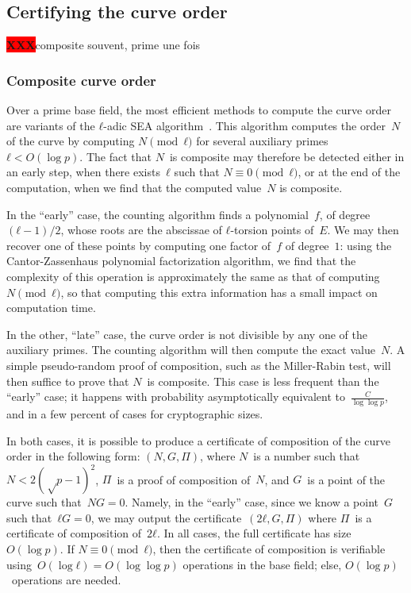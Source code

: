 \documentclass{article}
\def\XXX{{\colorbox{red}{{\color{white}\bfseries XXX}}}}
\begin{document}
\subsection{Certifying the curve order}

\XXX composite souvent, prime une fois

\subsubsection{Composite curve order}

Over a prime base field,
the most efficient methods to compute the curve order are
variants of the $ℓ$-adic SEA algorithm~\cite{mathcomp1985schoof,
jtnb1995schoof}.
This algorithm computes the order~$N$ of the curve
by computing $N \pmod{ℓ}$ for several
auxiliary primes~$ℓ < O(\log p)$.
The fact that $N$~is composite may therefore be detected
either in an early step,
when there exists~$ℓ$ such that $N ≡ 0 \pmod{ℓ}$,
or at the end of the computation,
when we find that the computed value~$N$ is composite.

In the “early” case,
the counting algorithm finds a polynomial~$f$, of degree~$(ℓ-1)/2$,
whose roots are the abscissae of $ℓ$-torsion points of~$E$.
We may then recover one of these points by
computing one factor of~$f$ of degree~$1$:
using the Cantor-Zassenhaus polynomial factorization algorithm,
we find that the complexity of this operation
is approximately the same as that of computing~$N \pmod{ℓ}$,
so that computing this extra information
has a small impact on computation time.

\smallskip

In the other, “late” case, the curve order is not divisible
by any one of the auxiliary primes.
The counting algorithm will then compute the exact value~$N$.
A simple pseudo-random proof of composition,
such as the Miller-Rabin test,
will then suffice to prove that $N$~is composite.
This case is less frequent than the “early” case;
it happens with probability
asymptotically equivalent to~$\frac{C}{\log \log p}$,
and in a few percent of cases for cryptographic sizes.

\smallskip

In both cases, it is possible to produce a certificate of composition
of the curve order in the following form: $(N, G, Π)$,
where $N$~is a number such that~$N < 2 (√p - 1)^2$,
$Π$~is a proof of composition of~$N$,
and $G$~is a point of the curve such that~$N G = 0$.
Namely, in the “early” case, since we know a point~$G$ such that~$ℓ G = 0$,
we may output the certificate~$(2 ℓ, G, Π)$
where $Π$~is a certificate of composition of~$2 ℓ$.
In all cases, the full certificate has size~$O(\log p)$.
If $N ≡ 0 \pmod{ℓ}$, then the certificate of composition
is verifiable using~$O(\log ℓ) = O(\log \log p)$ operations in the base field;
else, $O(\log p)$~operations are needed.
\end{document}
